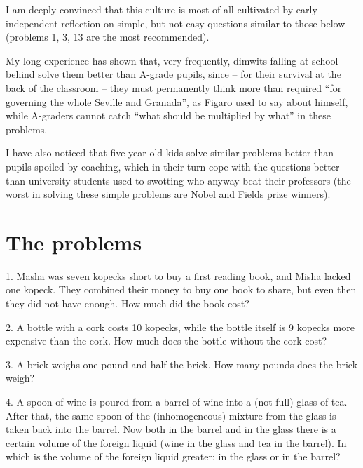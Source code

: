 I am deeply convinced that this culture is most of all cultivated by early independent reflection
on simple, but not easy questions similar to those below (problems 1, 3, 13 are the most recommended).

My long experience has shown that, very frequently, dimwits falling at school behind solve them better
than A-grade pupils, since -- for their survival at the back of the classroom -- they must permanently
think more than required \enquote{for governing the whole Seville and Granada}, as Figaro used to say about
himself, while A-graders cannot catch \enquote{what should be multiplied by what} in these problems.

I have also noticed that five year old kids solve similar problems better than pupils spoiled
by coaching, which in their turn cope with the questions better than university students used
to swotting who anyway beat their professors (the worst in solving these simple problems are
Nobel and Fields prize winners).   

\clearpage
\section*{The problems}

\begin{problem}{1.}
	Masha was seven kopecks short to buy a first reading book, and Misha lacked one kopeck.
	They combined their money to buy one book to share, but even then they did not have enough.
	How much did the book cost?
\end{problem}

\begin{problem}{2.}
	A bottle with a cork costs 10 kopecks, while the bottle itself is 9 kopecks more expensive
	than the cork. How much does the bottle without the cork cost?
\end{problem}

\begin{problem}{3.}
	A brick weighs one pound and half the brick. How many pounds does the brick weigh?
\end{problem}

\begin{problem}{4.}
	A spoon of wine is poured from a barrel of wine into a (not full) glass of tea.
	After that, the same spoon of the (inhomogeneous) mixture from the glass is taken back into the barrel.
	Now both in the barrel and in the glass there is a certain volume of the foreign liquid (wine in the glass and
	tea in the barrel). In which is the volume of the foreign liquid greater: in the glass or in the barrel?
\end{problem}

